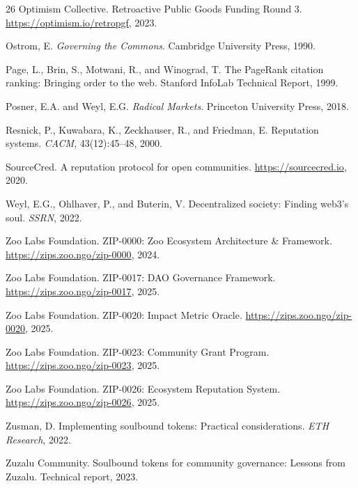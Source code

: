 \documentclass[11pt,letterpaper]{article}
\begin{document}
\begin{thebibliography}{26}
Optimism Collective.
\newblock Retroactive Public Goods Funding Round 3.
\newblock \url{https://optimism.io/retropgf}, 2023.

Ostrom, E.
\newblock \emph{Governing the Commons}.
\newblock Cambridge University Press, 1990.

Page, L., Brin, S., Motwani, R., and Winograd, T.
\newblock The PageRank citation ranking: Bringing order to the web.
\newblock Stanford InfoLab Technical Report, 1999.

Posner, E.A. and Weyl, E.G.
\newblock \emph{Radical Markets}.
\newblock Princeton University Press, 2018.

Resnick, P., Kuwabara, K., Zeckhauser, R., and Friedman, E.
\newblock Reputation systems.
\newblock \emph{CACM}, 43(12):45--48, 2000.

SourceCred.
\newblock A reputation protocol for open communities.
\newblock \url{https://sourcecred.io}, 2020.

Weyl, E.G., Ohlhaver, P., and Buterin, V.
\newblock Decentralized society: Finding web3's soul.
\newblock \emph{SSRN}, 2022.

Zoo Labs Foundation.
\newblock ZIP-0000: Zoo Ecosystem Architecture \& Framework.
\newblock \url{https://zips.zoo.ngo/zip-0000}, 2024.

Zoo Labs Foundation.
\newblock ZIP-0017: DAO Governance Framework.
\newblock \url{https://zips.zoo.ngo/zip-0017}, 2025.

Zoo Labs Foundation.
\newblock ZIP-0020: Impact Metric Oracle.
\newblock \url{https://zips.zoo.ngo/zip-0020}, 2025.

Zoo Labs Foundation.
\newblock ZIP-0023: Community Grant Program.
\newblock \url{https://zips.zoo.ngo/zip-0023}, 2025.

Zoo Labs Foundation.
\newblock ZIP-0026: Ecosystem Reputation System.
\newblock \url{https://zips.zoo.ngo/zip-0026}, 2025.

Zusman, D.
\newblock Implementing soulbound tokens: Practical considerations.
\newblock \emph{ETH Research}, 2022.

Zuzalu Community.
\newblock Soulbound tokens for community governance: Lessons from Zuzalu.
\newblock Technical report, 2023.

\end{thebibliography}
\end{document}
